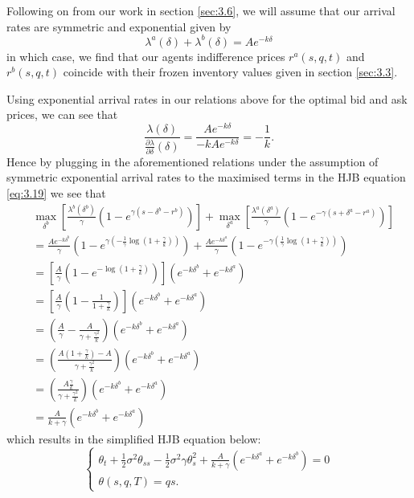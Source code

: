 Following on from our work in section \ref{sec:3.6}, we will assume that our arrival 
rates are symmetric and exponential given by 
\begin{equation}
    \lambda^a(\delta)+\lambda^b(\delta)=Ae^{-k\delta}
\end{equation}
in which case, we find that our agents indifference prices $r^a(s,q,t)$ and $r^b(s,q,t)$
coincide with their frozen inventory values given in section \ref{sec:3.3}.

Using exponential arrival rates in our relations above for the optimal bid and 
ask prices, we can see that
\begin{equation*}
    \frac{\lambda(\delta)}{\frac{\partial\lambda}{\partial\delta}(\delta)}=\frac{Ae^{-k\delta}}{-kAe^{-k\delta}}=-\frac{1}{k}.
\end{equation*}
Hence by plugging in the aforementioned relations under the assumption of symmetric
exponential arrival rates to the maximised terms in the HJB equation \ref{eq:3.19}
we see that
\begin{align*}
    &\max\limits_{\delta^b}\left[\frac{\lambda^b(\delta^b)}{\gamma}(1-e^{\gamma(s-\delta^b-r^b)})\right]+\max\limits_{\delta^a}\left[\frac{\lambda^a(\delta^a)}{\gamma}(1-e^{-\gamma(s+\delta^a-r^a)})\right]\\
    &=\frac{Ae^{-k\delta^b}}{\gamma}\left(1-e^{\gamma\left(-\frac{1}{\gamma}\log\left(1+\frac{\gamma}{k}\right)\right)}\right)+\frac{Ae^{-k\delta^a}}{\gamma}\left(1-e^{-\gamma\left(\frac{1}{\gamma}\log\left(1+\frac{\gamma}{k}\right)\right)}\right)\\
    &=\left[\frac{A}{\gamma}\left(1-e^{-\log\left(1+\frac{\gamma}{k}\right)}\right)\right](e^{-k\delta^b}+e^{-k\delta^a})\\
    &=\left[\frac{A}{\gamma}\left(1-\frac{1}{1+\frac{\gamma}{k}}\right)\right](e^{-k\delta^b}+e^{-k\delta^a})\\
    &=\left(\frac{A}{\gamma}-\frac{A}{\gamma+\frac{\gamma^2}{k}}\right)(e^{-k\delta^b}+e^{-k\delta^a})\\
    &=\left(\frac{A\left(1+\frac{\gamma}{k}\right)-A}{\gamma+\frac{\gamma^2}{k}}\right)(e^{-k\delta^b}+e^{-k\delta^a})\\
    &=\left(\frac{A\frac{\gamma}{k}}{\gamma+\frac{\gamma^2}{k}}\right)(e^{-k\delta^b}+e^{-k\delta^a})\\
    &=\frac{A}{k+\gamma}(e^{-k\delta^b}+e^{-k\delta^a})
\end{align*}
which results in the simplified HJB equation below:
\begin{equation}\label{eq:simp-hjb}
    \begin{cases} 
        \theta_t+\frac{1}{2}\sigma^2\theta_{ss}-\frac{1}{2}\sigma^2\gamma\theta^2_s+\frac{A}{k+\gamma}(e^{-k\delta^a}+e^{-k\delta^b})=0\\
        \theta(s,q,T)=qs.
    \end{cases}
\end{equation}
